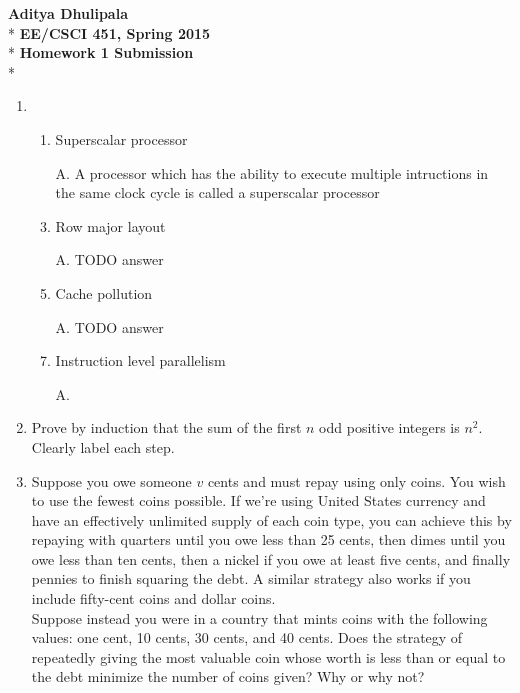 \documentclass{article}
\begin{document}
\thispagestyle{empty}
\date{}




\Large
\begin{center}
	\textbf{Aditya Dhulipala}
	\\*
	\textbf{EE/CSCI 451, Spring 2015 }
	\\*
	\textbf{Homework 1 Submission}
	\\*
\end{center}

\normalsize

\begin{enumerate}[label=\Large\textbf{\arabic*}.]


\item
\begin{enumerate}[label={\arabic*}.]
	\item Superscalar processor
	\item[A.] A processor which has the ability to execute multiple intructions in the same clock cycle is called a superscalar processor
	\\
	\item Row major layout
	\item[A.] TODO answer
	\\
	\item Cache pollution
	\item[A.] TODO answer
	\\
	\item Instruction level parallelism
	\item[A.] 
\end{enumerate}

\item  Prove by induction that the sum of the first $n$ odd positive integers is $n^2$.  Clearly label each step.


\item Suppose you owe someone $v$ cents and must repay using only coins.  You wish to use the fewest coins possible.  If we're using United States currency and have an effectively unlimited supply of each coin type, you can achieve this by repaying with quarters until you owe less than 25 cents, then dimes until you owe less than ten cents, then a nickel if you owe at least five cents, and finally pennies to finish squaring the debt.  A similar strategy also works if you include fifty-cent coins and dollar coins.\\
Suppose instead you were in a country that mints coins with the following values:  one cent, 10 cents, 30 cents, and 40 cents.   Does the strategy of repeatedly giving the most valuable coin whose worth is less than or equal to the debt minimize the number of coins given?  Why or why not?



\end{enumerate}
\end{document}
